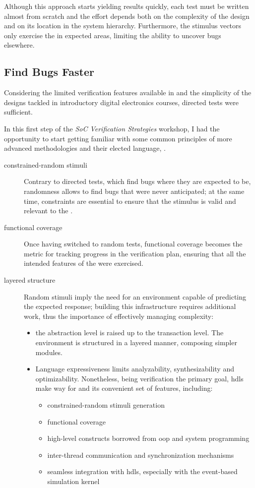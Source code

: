 Although this approach starts yielding results quickly, each test must be written almost from scratch and the effort depends both on the complexity of the design and on its location in the system hierarchy. Furthermore, the stimulus vectors only exercise the \dut in expected areas, limiting the ability to uncover bugs elsewhere.

\subsection{Find Bugs Faster}\label{subsec:find-bugs-faster}
Considering the limited verification features available in \vhdl and the simplicity of the designs tackled in introductory digital electronics courses, directed tests were sufficient. 

In this first step of the \emph{SoC Verification Strategies} workshop, I
had the opportunity to start getting familiar with some common principles of more advanced methodologies and their elected language, \sv.
\begin{description}
    \item[constrained-random stimuli] Contrary to directed tests, which find bugs where they are expected to be, randomness allows to find bugs that were never anticipated; at the same time, constraints are essential to ensure that the stimulus is valid and relevant to the \dut.
    \item[functional coverage] Once having switched to random tests, functional coverage becomes the metric for tracking progress in the verification plan, ensuring that all the intended features of the \dut were exercised.
    \item[layered structure] Random stimuli imply the need for an environment capable of predicting the expected response; building this infrastructure requires additional work, thus the importance of effectively managing complexity:
    \begin{itemize}
        \item the abstraction level is raised up to the transaction level. The environment is structured in a layered manner, composing simpler modules. 
        \item Language expressiveness limits analyzability, synthesizability and optimizability. Nonetheless, being verification the primary goal, \ac{hdl}s make way for \sv and its convenient set of features, including:
        \begin{itemize}
            \item constrained-random stimuli generation
            \item functional coverage
            \item high-level constructs borrowed from \ac{oop} and system programming
            \item inter-thread communication and synchronization mechanisms
            \item seamless integration with \ac{hdl}s, especially with the event-based simulation kernel
        \end{itemize}
    \end{itemize}
\end{description}

